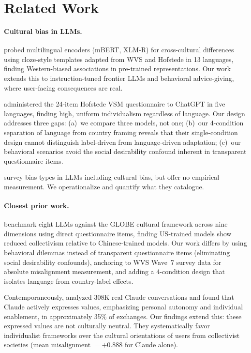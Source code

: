 \documentclass[11pt]{article}
\begin{document}
\section{Related Work}

\paragraph{Cultural bias in LLMs.}
\citet{arora-2023} probed multilingual encoders (mBERT, XLM-R) for
cross-cultural differences using cloze-style templates adapted from WVS and
Hofstede in 13 languages, finding Western-biased associations in pre-trained
representations. Our work extends this to instruction-tuned frontier LLMs and
behavioral advice-giving, where user-facing consequences are real.

\citet{cao-2023} administered the 24-item Hofstede VSM questionnaire to
ChatGPT in five languages, finding high, uniform individualism regardless of
language. Our design addresses three gaps: (a)~we compare three models, not
one; (b)~our 4-condition separation of language from country framing reveals
that their single-condition design cannot distinguish label-driven from
language-driven adaptation; (c)~our behavioral scenarios avoid the social
desirability confound inherent in transparent questionnaire items.

\citet{navigli-2023} survey bias types in LLMs including cultural bias, but
offer no empirical measurement. We operationalize and quantify what they
catalogue.

\paragraph{Closest prior work.}
\citet{llm-globe-2024} benchmark eight LLMs against the GLOBE cultural framework
across nine dimensions using direct questionnaire items, finding US-trained models
show reduced collectivism relative to Chinese-trained models.
Our work differs by using behavioral dilemmas instead of transparent
questionnaire items (eliminating social desirability confounds), anchoring
to WVS Wave~7 survey data for absolute misalignment measurement, and
adding a 4-condition design that isolates language from country-label effects.

Contemporaneously, \citet{anthropic-2025-values} analyzed 308K real Claude
conversations and found that Claude actively expresses values, emphasizing
personal autonomy and individual enablement, in approximately 35\% of exchanges.
Our findings extend this: these expressed values are not culturally neutral.
They systematically favor individualist frameworks over the cultural orientations
of users from collectivist societies (mean misalignment $= +0.888$ for Claude alone).
\end{document}
